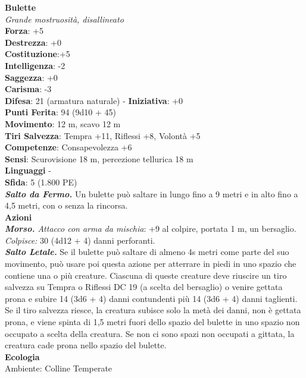 \begin{multicols}{2}
\medskip\textbf{Bulette}\\
\emph{Grande mostruosità, disallineato}\\
\textbf{Forza}: +5\\
\textbf{Destrezza}: +0\\
\textbf{Costituzione}:+5\\
\textbf{Intelligenza}: -2\\
\textbf{Saggezza}: +0\\
\textbf{Carisma}: -3\\
\textbf{Difesa}: 21 (armatura naturale) - \textbf{Iniziativa}: +0\\
\textbf{Punti Ferita}: 94 (9d10 + 45)\\
\textbf{Movimento}: 12 m, scavo 12 m\\
\textbf{Tiri Salvezza}: Tempra +11, Riflessi +8, Volontà +5\\
\textbf{Competenze}: Consapevolezza +6\\
\textbf{Sensi}: Scurovisione 18 m, percezione tellurica 18 m\\
\textbf{Linguaggi} -\\
\textbf{Sfida}: 5 (1.800 PE)\smallskip\\
\emph{\textbf{Salto da Fermo.}} Un bulette può saltare in lungo fino a 9 metri e in alto fino a 4,5 metri, con o senza la rincorsa.\\
\smallskip\textbf{Azioni}\\
\emph{\textbf{Morso.} Attacco con arma da mischia}: +9 al colpire, portata 1 m, un bersaglio.\\
\emph{Colpisce:} 30 (4d12 + 4) danni perforanti.\\
\emph{\textbf{Salto Letale.}} Se il bulette può saltare di almeno 4s metri come parte del suo movimento, può usare poi questa azione per atterrare in piedi in uno spazio che contiene una o più creature. Ciascuna di queste creature deve riuscire un tiro salvezza su Tempra o Riflessi DC  19 (a scelta del bersaglio) o venire gettata prona e subire 14 (3d6 + 4) danni contundenti più 14 (3d6 + 4) danni taglienti. Se il tiro salvezza riesce, la creatura subisce solo la metà dei danni, non è gettata prona, e viene spinta di 1,5 metri fuori dello spazio del bulette in uno spazio non occupato a scelta della creatura. Se non ci sono spazi non occupati a gittata, la creatura cade prona nello spazio del bulette.\\
\textbf{Ecologia}\\
Ambiente: Colline Temperate\\

\end{multicols}

